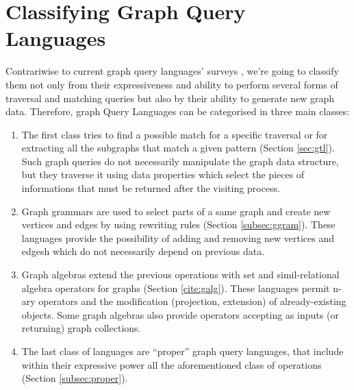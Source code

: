 \section{Classifying Graph Query Languages}\label{sec:dbqlang}

%

Contrariwise to current graph query languages' surveys \cite{AnglesABHRV17}, we're going to classify them not only from their expressiveness and ability to perform several forms of traversal and matching queries but also by their ability to generate new graph data. Therefore, graph Query Languages can be categorised in three main classes:
\begin{enumerate}
	\item The first class  tries to find a
	possible match for a specific traversal  or for extracting all the subgraphs that match a given pattern (Section \vref{sec:gtl}). Such graph
	queries do not necessarily manipulate the graph data structure, but they  traverse it using data properties which select the pieces of informations that must be returned after the visiting process.
	\item Graph grammars  are used to select  parts of a same graph and create new vertices and edges by using rewriting rules (Section \vref{subsec:ggram}). These languages provide the possibility of adding and removing new vertices and edgesh which do not necessarily depend on previous data.
	\item Graph algebras extend the previous operations with set and simil-relational algebra operators for graphs (Section \vref{cite:galg}). These languages permit n-ary operators and the modification (projection, extension) of already-existing objects. Some graph algebras also provide operators accepting as inputs (or returning) graph collections.
	\item The last class of languages are ``proper'' graph query languages, that include within their expressive power all the aforementioned class of operations (Section \vref{subsec:proper}).
\end{enumerate}

